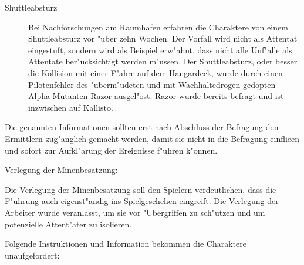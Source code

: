 \begin{description}
	\item[Shuttleabsturz] Bei Nachforschungen am Raumhafen erfahren die Charaktere von einem Shuttleabsturz vor "uber zehn Wochen. Der 
		Vorfall wird nicht als Attentat eingestuft, sondern wird als Beispiel erw"ahnt, dass nicht alle Unf"alle als Attentate ber"ucksichtigt werden m"ussen. Der Shuttleabsturz, oder besser die Kollision mit einer F"ahre auf dem Hangardeck, wurde durch einen Pilotenfehler des "uberm"udeten und mit Wachhaltedrogen gedopten Alpha-Mutanten Razor ausgel"ost. Razor wurde bereits befragt und ist inzwischen auf Kallisto.
\end{description}

\begin{remarks}
	Die genannten Informationen sollten erst nach Abschluss der Befragung den Ermittlern zug"anglich gemacht werden, damit sie nicht in die Befragung einflie\3en und sofort zur Aufkl"arung der Ereignisse f"uhren k"onnen.

	\underline{Verlegung der Minenbesatzung:}

	Die Verlegung der Minenbesatzung soll den Spielern verdeutlichen, dass die F"uhrung auch eigenst"andig ins Spielgeschehen eingreift. Die Verlegung der Arbeiter wurde veranlasst, um sie vor "Ubergriffen zu sch"utzen und um potenzielle Attent"ater zu isolieren.
\end{remarks}


Folgende Instruktionen und Information bekommen die Charaktere unaufgefordert:

